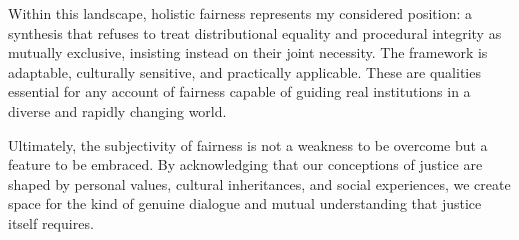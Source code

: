 \documentclass[11pt,showkeys]{essay}
\begin{document}
Within this landscape, holistic fairness represents my considered position: a synthesis that refuses to treat distributional equality and procedural integrity as mutually exclusive, insisting instead on their joint necessity. The framework is adaptable, culturally sensitive, and practically applicable. These are qualities essential for any account of fairness capable of guiding real institutions in a diverse and rapidly changing world.

Ultimately, the subjectivity of fairness is not a weakness to be overcome but a feature to be embraced. By acknowledging that our conceptions of justice are shaped by personal values, cultural inheritances, and social experiences, we create space for the kind of genuine dialogue and mutual understanding that justice itself requires.


\end{document}
